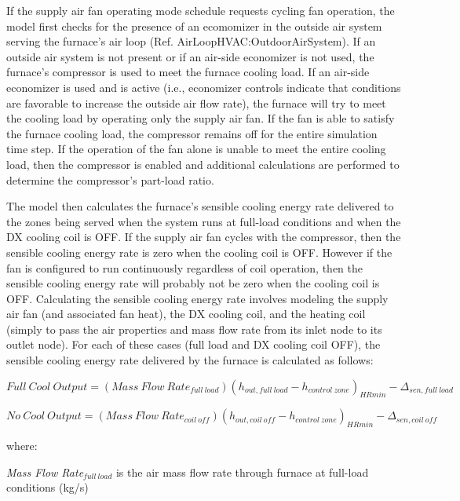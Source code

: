 If the supply air fan operating mode schedule requests cycling fan operation, the model first checks for the presence of an ecomomizer in the outside air system serving the furnace's air loop (Ref. AirLoopHVAC:OutdoorAirSystem). If an outside air system is not present or if an air-side economizer is not used, the furnace's compressor is used to meet the furnace cooling load. If an air-side economizer is used and is active (i.e., economizer controls indicate that conditions are favorable to increase the outside air flow rate), the furnace will try to meet the cooling load by operating only the supply air fan. If the fan is able to satisfy the furnace cooling load, the compressor remains off for the entire simulation time step. If the operation of the fan alone is unable to meet the entire cooling load, then the compressor is enabled and additional calculations are performed to determine the compressor's part-load ratio.

The model then calculates the furnace's sensible cooling energy rate delivered to the zones being served when the system runs at full-load conditions and when the DX cooling coil is OFF. If the supply air fan cycles with the compressor, then the sensible cooling energy rate is zero when the cooling coil is OFF. However if the fan is configured to run continuously regardless of coil operation, then the sensible cooling energy rate will probably not be zero when the cooling coil is OFF. Calculating the sensible cooling energy rate involves modeling the supply air fan (and associated fan heat), the DX cooling coil, and the heating coil (simply to pass the air properties and mass flow rate from its inlet node to its outlet node). For each of these cases (full load and DX cooling coil OFF), the sensible cooling energy rate delivered by the furnace is calculated as follows:

\begin{equation}
Full~Cool~Output = (Mass~Flow~Rat{e_{full~load}}){({h_{out,full~load}} - {h_{control~zone}})_{HRmin}} - {\Delta_{sen,full~load}}
\end{equation}

\begin{equation}
No~Cool~Output = (Mass~Flow~Rat{e_{coil~off}}){({h_{out,coil~off}} - {h_{control~zone}})_{HRmin}} - {\Delta_{sen,coil~off}}
\end{equation}

where:

\emph{Mass Flow Rate\(_{full~load}\)} is the air mass flow rate through furnace at full-load conditions (kg/s)

